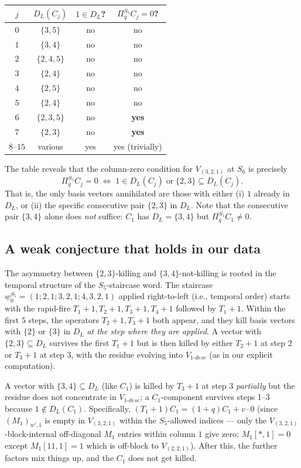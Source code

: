 \documentclass[11pt]{article}
\theoremstyle{definition}
\begin{document}
\begin{center}
\begin{tabular}{c|c|c|c}
$j$ & $D_L(C_j)$ & $1 \in D_L$? & $\Pi_q^{S_5}C_j = 0$?\\\hline
$0$ & $\{3, 5\}$ & no & no\\
$1$ & $\{3, 4\}$ & no & no\\
$2$ & $\{2, 4, 5\}$ & no & no\\
$3$ & $\{2, 4\}$ & no & no\\
$4$ & $\{2, 5\}$ & no & no\\
$5$ & $\{2, 4\}$ & no & no\\
$6$ & $\{2, 3, 5\}$ & no & \textbf{yes}\\
$7$ & $\{2, 3\}$ & no & \textbf{yes}\\
$8$--$15$ & various & yes & yes (trivially)
\end{tabular}
\end{center}

The table reveals that the column-zero condition for $V_{(3,2,1)}$ at $S_6$ is precisely
\[
\Pi_q^{S_5} C_j = 0 \;\Longleftrightarrow\; 1 \in D_L(C_j) \;\text{or}\; \{2, 3\} \subseteq D_L(C_j).
\]
That is, the only basis vectors annihilated are those with either (i) $1$ already in $D_L$, or (ii) the specific consecutive pair $\{2, 3\}$ in $D_L$. Note that the consecutive pair $\{3, 4\}$ alone does \emph{not} suffice: $C_1$ has $D_L = \{3, 4\}$ but $\Pi_q^{S_5} C_1 \neq 0$.

\subsection*{A weak conjecture that holds in our data}

The asymmetry between $\{2, 3\}$-killing and $\{3, 4\}$-not-killing is rooted in the temporal structure of the $S_5$-staircase word. The staircase $\underline{w}_0^{S_5} = (1; 2,1; 3,2,1; 4,3,2,1)$ applied right-to-left (i.e., temporal order) starts with the rapid-fire $T_1+1, T_2+1, T_3+1, T_4+1$ followed by $T_1+1$. Within the first $5$ steps, the operators $T_2+1, T_3+1$ both appear, and they kill basis vectors with $\{2\}$ or $\{3\}$ in $D_L$ \emph{at the step where they are applied}. A vector with $\{2, 3\} \subseteq D_L$ survives the first $T_1+1$ but is then killed by either $T_2+1$ at step 2 or $T_3+1$ at step 3, with the residue evolving into $V_{1\text{-}desc}$ (as in our explicit computation).

A vector with $\{3, 4\} \subseteq D_L$ (like $C_1$) is killed by $T_3+1$ at step 3 \emph{partially} but the residue does not concentrate in $V_{1\text{-}desc}$; a $C_1$-component survives steps 1--3 because $1 \notin D_L(C_1)$. Specifically, $(T_1+1)C_1 = (1+q)C_1 + v\cdot 0$ (since $(M_1)_{w', 1}$ is empty in $V_{(3,2,1)}$ within the $S_5$-allowed indices --- only the $V_{(3,2,1)}$-block-internal off-diagonal $M_1$ entries within column $1$ give zero; $M_1[*, 1] = 0$ except $M_1[11, 1] = 1$ which is off-block to $V_{(2,2,1)}$). After this, the further factors mix things up, and the $C_1$ does not get killed.
\end{document}

